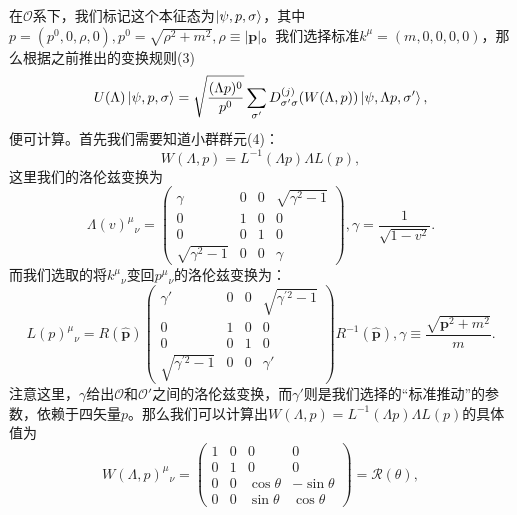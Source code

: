 在$ \mathcal{O}$系下，我们标记这个本征态为$ \ket{\psi ,p,\sigma }$，其中$ p=(p^{0} ,0,\rho ,0),p^{0} =\sqrt{\rho ^{2} +m^{2}} ,\rho \equiv | \boldsymbol{p}| $。我们选择标准$ k^{\mu } =( m,0,0,0,0)$，那么根据之前推出的变换规则(3)
\begin{equation*}
	U( \Lambda )\ket{\psi ,p,\sigma } =\sqrt{\frac{( \Lambda p)^{0}}{p^{0}}}\sum _{\sigma '} D_{\sigma '\sigma }^{( j)}( W( \Lambda ,p))\ket{\psi ,\Lambda p,\sigma '} ,
\end{equation*}
便可计算。首先我们需要知道小群群元(4)：
\begin{equation*}
	W( \Lambda ,p) =L^{-1}( \Lambda p) \Lambda L( p) ,
\end{equation*}
这里我们的洛伦兹变换为
\begin{equation*}
	\Lambda ( v)^{\mu }{}_{\nu } =\begin{pmatrix}
		\gamma  & 0 & 0 & \sqrt{\gamma ^{2} -1}\\
		0 & 1 & 0 & 0\\
		0 & 0 & 1 & 0\\
		\sqrt{\gamma ^{2} -1} & 0 & 0 & \gamma 
	\end{pmatrix} ,\gamma =\frac{1}{\sqrt{1-v^{2}}} .
\end{equation*}
而我们选取的将$k^{\mu }{}_{\nu }$变回$p^{\mu }{}_{\nu }$的洛伦兹变换为：
\begin{equation*}
	L( p)^{\mu }{}_{\nu } =R(\hat{\boldsymbol{p}})\begin{pmatrix}
		\gamma ' & 0 & 0 & \sqrt{\gamma ^{\prime 2} -1}\\
		0 & 1 & 0 & 0\\
		0 & 0 & 1 & 0\\
		\sqrt{\gamma ^{\prime 2} -1} & 0 & 0 & \gamma '
	\end{pmatrix} R^{-1}(\hat{\boldsymbol{p}}) ,\gamma \equiv \frac{\sqrt{\boldsymbol{p}^{2} +m^{2}}}{m} .
\end{equation*}
注意这里，$\gamma $给出$\mathcal{O}$和$\mathcal{O} '$之间的洛伦兹变换，而$\gamma '$则是我们选择的“标准推动”的参数，依赖于四矢量$p$。那么我们可以计算出$W( \Lambda ,p) =L^{-1}( \Lambda p) \Lambda L( p)$的具体值为
\begin{equation}
	W( \Lambda ,p)^{\mu }{}_{\nu } =\left(\begin{matrix}
		1 & 0 & 0 & 0\\
		0 & 1 & 0 & 0\\
		0 & 0 & \cos \theta  & -\sin \theta \\
		0 & 0 & \sin \theta  & \cos \theta 
	\end{matrix}\right) =\mathscr{R}( \theta ) ,
\end{equation}
